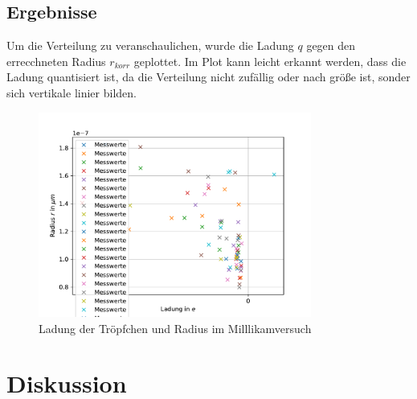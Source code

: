 \documentclass[11pt, a4paper]{article}
\begin{document}
    \subsection{Ergebnisse}
    Um die Verteilung zu veranschaulichen, wurde die Ladung $q$ gegen den errecchneten Radius $r_{korr}$ geplottet. Im Plot kann leicht erkannt werden, dass die Ladung quantisiert ist, da die Verteilung nicht zufällig oder nach größe ist, sonder sich vertikale linier bilden.
    \begin{figure}[h]
        \centering
        \includegraphics[width=0.8\textwidth]{millikan.pdf}
        \caption{Ladung der Tröpfchen und Radius im Milllikamversuch}
        \label{fig:milllikam}
    \end{figure}


    \section{Diskussion}

    
    
\end{document}
